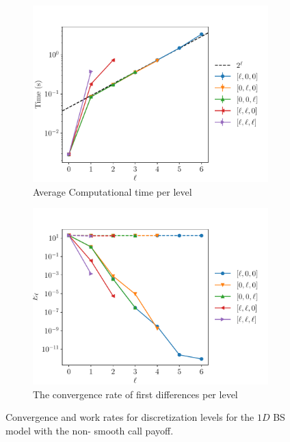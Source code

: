 \documentclass[11pt]{article}
\begin{document}
\begin{figure}[!h]
	\centering
	\begin{subfigure}{.5\textwidth}
		\centering
		\includegraphics[width=0.95\linewidth]{./figures/1D_BS_4_steps_non_smooth_richardson_finer/level_work.pdf}
		\caption{Average Computational time per level}
		\label{fig:misc_1D_BS_non_smooth_4steps_sub3}
	\end{subfigure}%
	\begin{subfigure}{.5\textwidth}
		\centering
		\includegraphics[width=0.95\linewidth]{./figures/1D_BS_4_steps_non_smooth_richardson_finer/levels_error_rate.pdf}
		\caption{ The convergence rate of first differences per level}
		\label{fig:misc_1D_BS_non_smooth_4steps_sub4}
	\end{subfigure}%
	\caption{Convergence and work rates for discretization levels for the $1D$ BS model with the non- smooth call payoff.}
	\label{fig:misc_1D_BS_4teps_2}
\end{figure}
\end{document}
